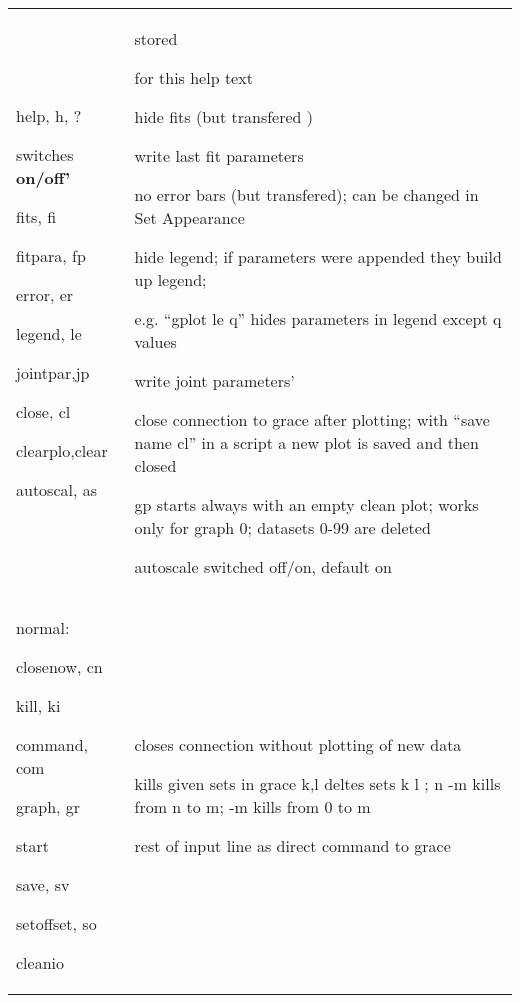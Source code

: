 \documentclass[]{article}
\begin{document}
\begin{longtable}[]{@{}ll@{}}
\begin{minipage}[t]{0.47\columnwidth}
help, h, ?

switches \textbf{on/off'}

fits, fi

fitpara, fp

error, er

legend, le

jointpar,jp

close, cl

clearplo,clear

autoscal, as\strut
\end{minipage} & \begin{minipage}[t]{0.47\columnwidth}\raggedright
stored

for this help text

hide fits (but transfered )

write last fit parameters

no error bars (but transfered); can be changed in Set Appearance

hide legend; if parameters were appended they build up legend;

e.g. ``gplot le q'' hides parameters in legend except q values

write joint parameters'

close connection to grace after plotting; with ``save name cl'' in a
script a new plot is saved and then closed

gp starts always with an empty clean plot; works only for graph 0;
datasets 0-99 are deleted

autoscale switched off/on, default on\strut
\end{minipage}\tabularnewline
\begin{minipage}[t]{0.47\columnwidth}\raggedright
normal:

closenow, cn

kill, ki

command, com

graph, gr

start

save, sv

setoffset, so

cleanio\strut
\end{minipage} & \begin{minipage}[t]{0.47\columnwidth}\raggedright
closes connection without plotting of new data

kills given sets in grace k,l deltes sets k l ; n -m kills from n to m;
-m kills from 0 to m

rest of input line as direct command to grace


\end{minipage}
\end{longtable}
\end{document}
